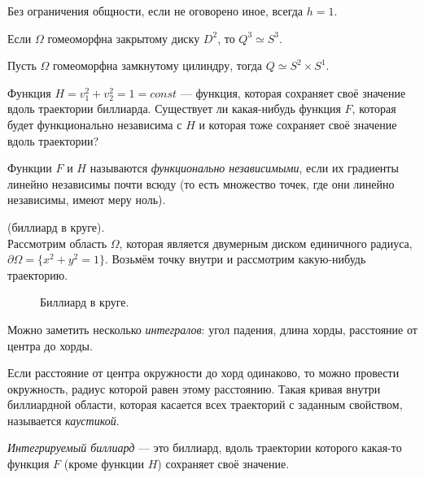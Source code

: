 \begin{remark}
    Без ограничения общности, если не оговорено иное, всегда $h=1$.
\end{remark}

\begin{statement}
    Если $\Omega$ гомеоморфна закрытому диску $D^2$, то $Q^3 \simeq S^3$.
\end{statement} 

\begin{statement}
    Пусть $\Omega$ гомеоморфна замкнутому цилиндру, тогда $Q \simeq S^2 \times S^1$.
\end{statement} 

Функция $H = v_1^2 + v_2^2 = 1 = const$ — функция, которая сохраняет своё значение вдоль траектории биллиарда. Существует ли какая-нибудь функция $F$, которая будет функционально независима с $H$ и которая тоже сохраняет своё значение вдоль траектории?

\begin{definition}
    Функции $F$ и $H$ называются \textit{функционально независимыми}, если их градиенты линейно независимы почти всюду (то есть множество точек, где они линейно независимы, имеют меру ноль).
\end{definition} 


\begin{example}(биллиард в круге).\\
    Рассмотрим область $\Omega$, которая является двумерным диском единичного радиуса, $\partial \Omega = \{x^2+y^2=1\}$. Возьмём точку внутри и рассмотрим какую-нибудь траекторию.

    \begin{figure}[ht]
        \centering
        \caption{Биллиард в круге.}
        \label{fig:c15.3}
    \end{figure}

    Можно заметить несколько \textit{интегралов}: угол падения, длина хорды, расстояние от центра до хорды.

    Если расстояние от центра окружности до хорд одинаково, то можно провести окружность, радиус которой равен этому расстоянию. Такая кривая внутри биллиардной области, которая касается всех траекторий с заданным свойством, называется \textit{каустикой}.
\end{example}

\begin{definition}
    \textit{Интегрируемый биллиард} — это биллиард, вдоль траектории которого какая-то функция $F$ (кроме функции $H$) сохраняет своё значение.
\end{definition} 

